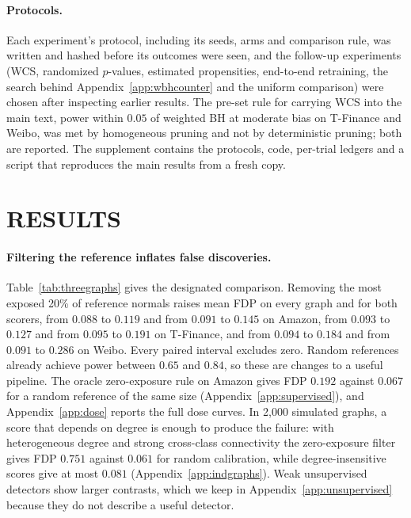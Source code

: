 \documentclass[twoside]{article}
\begin{document}
\paragraph{Protocols.}
Each experiment's protocol, including its seeds, arms and comparison rule, was written and hashed before its outcomes were seen, and the follow-up experiments (WCS, randomized $p$-values, estimated propensities, end-to-end retraining, the search behind Appendix~\ref{app:wbhcounter} and the uniform comparison) were chosen after inspecting earlier results. The pre-set rule for carrying WCS into the main text, power within $0.05$ of weighted BH at moderate bias on T-Finance and Weibo, was met by homogeneous pruning and not by deterministic pruning; both are reported. The supplement contains the protocols, code, per-trial ledgers and a script that reproduces the main results from a fresh copy.

\section{RESULTS}
\label{sec:results}


\paragraph{Filtering the reference inflates false discoveries.}
Table~\ref{tab:threegraphs} gives the designated comparison. Removing the most exposed 20\% of reference normals raises mean FDP on every graph and for both scorers, from $0.088$ to $0.119$ and from $0.091$ to $0.145$ on Amazon, from $0.093$ to $0.127$ and from $0.095$ to $0.191$ on T-Finance, and from $0.094$ to $0.184$ and from $0.091$ to $0.286$ on Weibo. Every paired interval excludes zero. Random references already achieve power between $0.65$ and $0.84$, so these are changes to a useful pipeline. The oracle zero-exposure rule on Amazon gives FDP $0.192$ against $0.067$ for a random reference of the same size (Appendix~\ref{app:supervised}), and Appendix~\ref{app:dose} reports the full dose curves. In 2,000 simulated graphs, a score that depends on degree is enough to produce the failure: with heterogeneous degree and strong cross-class connectivity the zero-exposure filter gives FDP $0.751$ against $0.061$ for random calibration, while degree-insensitive scores give at most $0.081$ (Appendix~\ref{app:indgraphs}). Weak unsupervised detectors show larger contrasts, which we keep in Appendix~\ref{app:unsupervised} because they do not describe a useful detector.
\end{document}

